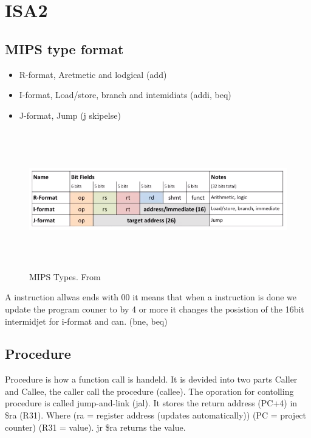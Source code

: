\section{ISA2}
\subsection{MIPS type format}
\begin{itemize}
\item  R-format, Aretmetic and lodgical (add)
\item  I-format, Load/store, branch and intemidiats (addi, beq)
\item  J-format, Jump (j skipelse) 
\end{itemize}

\begin{figure}[h]
    \vspace{10mm}
    \centering
    \includegraphics[width=17cm, height=6cm]{image/mips-types.png} 
    \caption{MIPS Types. From \cite{}}
    \label{MIPS-Types}
\end{figure}

A instruction allwas ends with 00 it means that when a instruction is done we update the program couner
to by 4 or more it changes the posistion of the 16bit intermidjet for i-format and can. (bne, beq)

\subsection{Procedure}
Procedure is how a function call is handeld. It is devided into two parts Caller and Callee,
the caller call the procedure (callee).
The oporation for contolling procedure is called jump-and-link (jal).
It stores the return address (PC+4) in \$ra (R31).
Where (ra = register address (updates automatically))
(PC = project counter)
(R31 = value).
jr \$ra returns the value.

